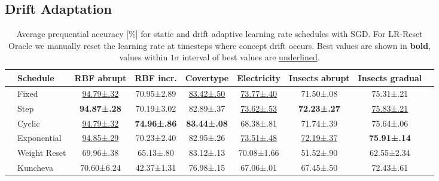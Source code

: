 \documentclass[runningheads]{llncs}
\begin{document}
\subsection{Drift Adaptation}

\begin{table}[ht]
	\centering
	\scriptsize
	\caption{Average prequential accuracy [\%] for static and drift adaptive learning rate schedules with SGD. For LR-Reset Oracle we manually reset the learning rate at timesteps where concept drift occurs. Best values are shown in \textbf{bold}, values within $1\sigma$ interval of best values are \underline{underlined}.}
	\begin{tabular}{llccccccc}
		\toprule
		                                                    & Schedule                                         & RBF abrupt            & RBF incr.           & Covertype             & Electricity           & Insects abrupt        & Insects gradual       \\
		\midrule
		\multirow{4}{*}{\rotatebox[origin=c]{90}{Static}}   & Fixed                                            & \underline{94.79±.32} & 70.95±2.89          & \underline{83.42±.50} & \underline{73.77±.40} & 71.50±.08             & 75.31±.21             \\
		                                                    & Step                                             & \bfseries 94.87±.28   & 70.19±3.02          & 82.89±.37             & \underline{73.62±.53} & \bfseries 72.23±.27   & \underline{75.83±.21} \\
		                                                    & Cyclic                                           & \underline{94.79±.32} & \bfseries 74.96±.86 & \bfseries 83.44±.08   & 68.38±.81             & 71.74±.39             & 75.64±.06             \\
		                                                    & Exponential                                      & \underline{94.85±.29} & 70.23±2.40          & 82.95±.26             & \underline{73.51±.48} & \underline{72.19±.37} & \bfseries 75.91±.14   \\ \midrule
		\multirow{4}{*}{\rotatebox[origin=c]{90}{Adaptive}} & Weight Reset                                     & 69.96±.38             & 65.13±.80           & 83.12±.13             & 70.08±1.66            & 51.52±.90             & 62.55±2.34            \\
		                                                    & Kuncheva \cite{kunchevaAdaptiveLearningRate2008} & 70.60±6.24            & 42.37±1.31          & 76.98±.15             & 67.06±.01             & 67.45±.50             & 72.43±.61             \\

\end{tabular}
\end{table}
\end{document}
